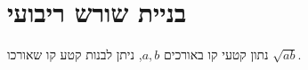 %


\section{בניית שורש ריבועי}\label{s.root}

\begin{theorem}\label{thm.root}
נתון קטעי קו באורכים
$a,b$,
ניתן לבנות קטע קו שאורכו
$\sqrt{ab}$.
\end{theorem}

